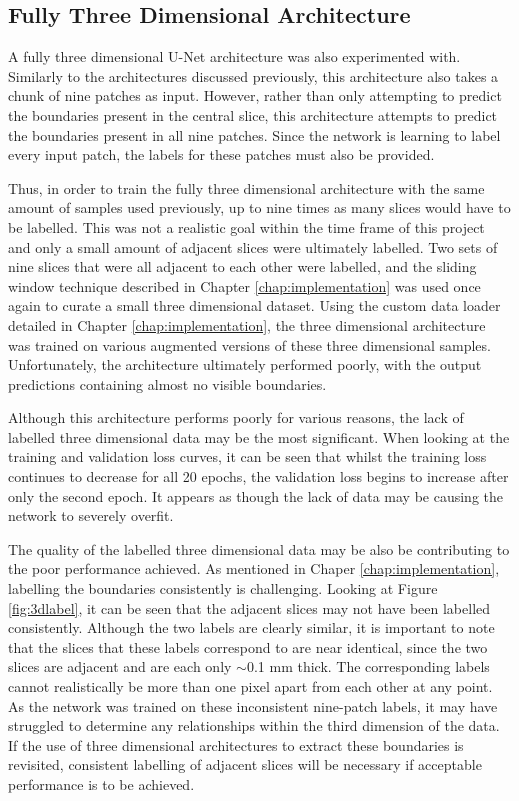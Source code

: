 \subsection{Fully Three Dimensional Architecture}
\label{sec:eval3darch}

A fully three dimensional U-Net architecture was also experimented with. Similarly to the architectures discussed previously, this architecture also takes a chunk of nine patches as input. However, rather than only attempting to predict the boundaries present in the central slice, this architecture attempts to predict the boundaries present in all nine patches. Since the network is learning to label every input patch, the labels for these patches must also be provided.

Thus, in order to train the fully three dimensional architecture with the same amount of samples used previously, up to nine times as many slices would have to be labelled. This was not a realistic goal within the time frame of this project and only a small amount of adjacent slices were ultimately labelled. Two sets of nine slices that were all adjacent to each other were labelled, and the sliding window technique described in Chapter \ref{chap:implementation} was used once again to curate a small three dimensional dataset. Using the custom data loader detailed in Chapter \ref{chap:implementation}, the three dimensional architecture was trained on various augmented versions of these three dimensional samples. Unfortunately, the architecture ultimately performed poorly, with the output predictions containing almost no visible boundaries.

Although this architecture performs poorly for various reasons, the lack of labelled three dimensional data may be the most significant. When looking at the training and validation loss curves, it can be seen that whilst the training loss continues to decrease for all 20 epochs, the validation loss begins to increase after only the second epoch. It appears as though the lack of data may be causing the network to severely overfit.

The quality of the labelled three dimensional data may be also be contributing to the poor performance achieved. As mentioned in Chaper \ref{chap:implementation}, labelling the boundaries consistently is challenging. Looking at Figure \ref{fig:3dlabel}, it can be seen that the adjacent slices may not have been labelled consistently. Although the two labels are clearly similar, it is important to note that the slices that these labels correspond to are near identical, since the two slices are adjacent and are each only ${\sim}$0.1 mm thick. The corresponding labels cannot realistically be more than one pixel apart from each other at any point. As the network was trained on these inconsistent nine-patch labels, it may have struggled to determine any relationships within the third dimension of the data. If the use of three dimensional architectures to extract these boundaries is revisited, consistent labelling of adjacent slices will be necessary if acceptable performance is to be achieved.


